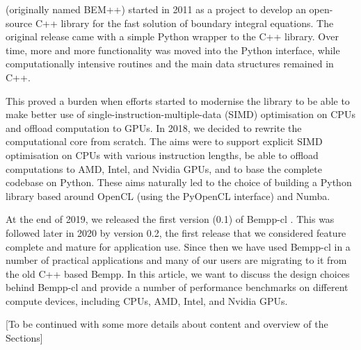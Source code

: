  (originally named BEM++) started in 2011 as a project to develop an open-source C++ library for the fast solution of boundary integral equations. The original release came with a simple Python wrapper to the C++ library. Over time, more and more functionality was moved into the Python interface, while computationally intensive routines and the main data structures remained in C++.

This proved a burden when efforts started to modernise the library to be able to make better use of single-instruction-multiple-data (SIMD) optimisation on CPUs and offload computation to GPUs. In 2018, we decided to rewrite the computational core from scratch. The aims were to support explicit SIMD optimisation on CPUs with various instruction lengths, be able to offload computations to AMD, Intel, and Nvidia GPUs, and to base the complete codebase on Python. These aims naturally led to the choice of building a Python library based around OpenCL (using the PyOpenCL interface) and Numba.

At the end of 2019, we released the first version (0.1) of Bempp-cl \cite{Bempp-cl}. This was followed later in 2020 by version 0.2, the first release that we considered feature complete and mature for application use. Since then we have used Bempp-cl in a number of practical applications and many of our users are migrating to it from the old C++ based Bempp. In this article, we want to discuss the design choices behind Bempp-cl and provide a number of performance benchmarks on different compute devices, including CPUs, AMD, Intel, and Nvidia GPUs.

[To be continued with some more details about content and overview of the Sections]
